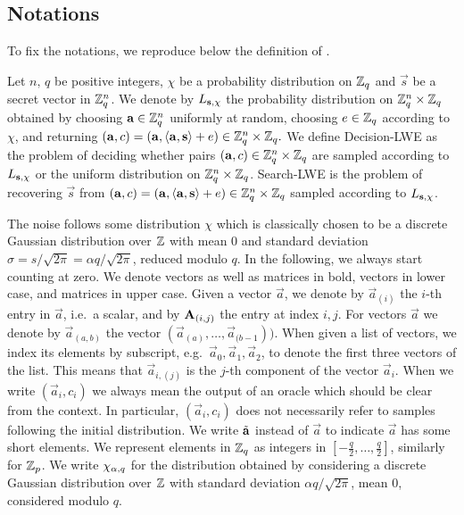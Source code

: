 \subsection{Notations}
To fix the notations, we reproduce below the definition of \LWE{}.
\begin{definition}\label{def:lwe} Let $n,\, q$ be positive integers, $\chi$ be a probability distribution on $\mathbb{Z}_q$ and $\vec{s}$ be a secret vector in $\mathbb{Z}_q^n$. We denote by $L_{\mathbf{s},\chi}$ the probability distribution on $\mathbb{Z}_q^n \times \mathbb{Z}_q$ obtained by choosing $\mathbf{a}\in \mathbb{Z}_q^n$ uniformly at random, choosing $e \in \mathbb{Z}_q$ according to $\chi$, and returning  $(\mathbf{a},c)=(\mathbf{a},\left\langle {\mathbf{a}},{\mathbf{s}}\right\rangle+ e) \in \mathbb{Z}_q^n \times \mathbb{Z}_q.$ We define 
\textnormal{Decision-LWE} as the problem of deciding whether pairs $(\mathbf{a},c)\in \mathbb{Z}_q^n \times \mathbb{Z}_q$ are sampled according to $L_{\mathbf{s},\chi}$ or the uniform distribution on $\mathbb{Z}_q^n \times \mathbb{Z}_q$. \textnormal{Search-LWE} is the problem of recovering $\vec{s}$ from $(\mathbf{a},c)=(\mathbf{a},\left\langle {\mathbf{a}},{\mathbf{s}}\right\rangle+ e) \in \mathbb{Z}_q^n \times \mathbb{Z}_q$ sampled according to $L_{\mathbf{s},\chi}$.  
\end{definition}
The noise follows some distribution $\chi$ which is classically chosen to be a discrete Gaussian distribution over $\mathbb{Z}$ with mean $0$ and standard deviation $\sigma = s/\sqrt{2 \pi} = \alpha q /\sqrt{2\pi}$, reduced modulo $q$.
In the following, we always start counting at zero.  We denote vectors as well as  matrices in bold, vectors in lower case, and matrices in upper case. Given a vector $\vec{a}$, we denote by $\vec{a}_{(i)}$ the $i$-th entry in $\vec{a}$, i.e.\ a scalar, and by $\mathbf{A}_{(i,j)}$ the entry at index $i,j$. For vectors $\vec{a}$ we denote by $\vec{a}_{(a,b)}$ the vector $(\vec{a}_{(a)},\dots,\vec{a}_{(b-1}))$. 
When given a list of vectors, we index its elements by subscript, e.g.\ $\vec{a}_0,\vec{a}_1, \vec{a}_2$, to denote the first 
three vectors of the list. This means that $\vec{a}_{i,(j)}$ is the $j$-th component of the vector $\vec{a}_i$.  When we write $(\vec{a}_i,c_i)$ we always mean the output of an oracle which should be clear from the context. In particular, $(\vec{a}_i,c_i)$ does not necessarily refer to samples following the initial distribution. We write $\tilde{\mathbf{a}}$ instead of $\vec{a}$ to indicate $\vec{a}$ has some short elements. 
We represent elements in $\mathbb{Z}_q$ as integers in $[-\frac{q}{2},\ldots,\frac{q}{2}]$, similarly for $\mathbb{Z}_p$. We write $\chi_{\alpha,q}$ for the distribution obtained by considering a discrete Gaussian distribution over $\mathbb{Z}$ with standard deviation $\alpha q /\sqrt{2\pi}$, mean $0$, considered modulo $q$.
